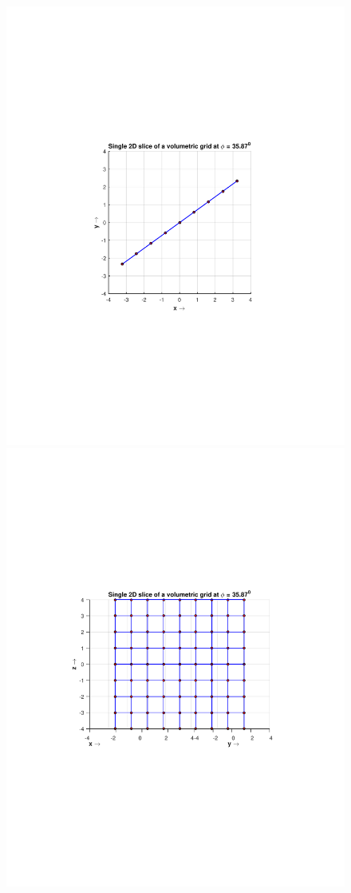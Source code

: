 \documentclass{UCF_ETD}
\begin{document}
\begin{figure}[H]
\begin{center}
\includegraphics[scale=0.5]{FVR/TopViewSingleSliceGrid}
\includegraphics[scale=0.5]{FVR/FlatSingleSliceGrid}

\end{center}
\end{figure}
\end{document}
